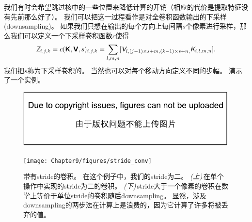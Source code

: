 我们有时会希望跳过核中的一些位置来降低计算的开销（相应的代价是提取特征没有先前那么好了）。
我们可以把这一过程看作是对全卷积函数输出的下采样(downsampling)。
如果我们只想在输出的每个方向上每间隔$s$个像素进行采样，那么我们可以定义一个下采样卷积函数$c$使得
\begin{equation}
\textit{\textsf{Z}}_{i,j,k} = c(\textsf{\textbf{K}}, \textsf{\textbf{V}}, s)_{i,j,k} = \sum_{l,m,n} [\textit{\textsf{V}}_{l,(j-1)\times s+m, (k-1)\times s +n,}
 \textit{\textsf{K}}_{i,l,m,n}].
 \label{eq:9.8}
\end{equation}
我们把$s$称为下采样卷积的。
当然也可以对每个移动方向定义不同的步幅。
演示了一个实例。
\begin{figure}[!htb]
\ifOpenSource
\centerline{\includegraphics{figure.pdf}}
\else
\centerline{\texttt{[image: Chapter9/figures/stride\_conv]}}
\fi
\caption{带有\gls{stride}的卷积。
在这个例子中，我们的\gls{stride}为二。
\emph{(上)}\,在单个操作中实现的\gls{stride}为二的卷积。
\emph{(下)}\,\gls{stride}大于一个像素的卷积在数学上等价于单位\gls{stride}的卷积随后\gls{downsampling}。
显然，涉及\gls{downsampling}的两步法在计算上是浪费的，因为它计算了许多将被丢弃的值。}
\label{fig:chap9_stride_conv}
\end{figure}


